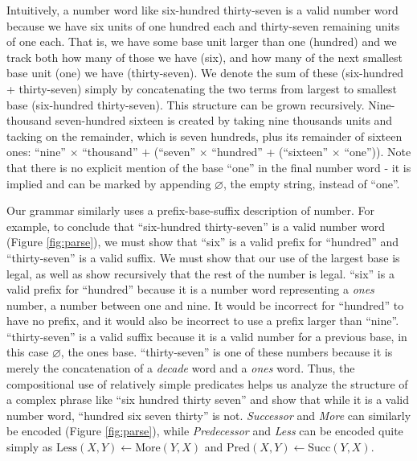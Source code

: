 \documentclass[10pt,letterpaper]{article}
\begin{document}
Intuitively, a number word like six-hundred thirty-seven is a valid
number word because we have six units of one hundred each and
thirty-seven remaining units of one each. That is, we have some base
unit larger than one (hundred) and we track both how many of those we
have (six), and how many of the next smallest base unit (one) we have
(thirty-seven). We denote the sum of these (six-hundred +
thirty-seven) simply by concatenating the two terms from largest to
smallest base (six-hundred thirty-seven). This structure can be grown
recursively. Nine-thousand seven-hundred sixteen is created by taking
nine thousands units and tacking on the remainder, which is seven
hundreds, plus its remainder of sixteen ones: ``nine'' $\times$
``thousand'' $+$ (``seven'' $\times$ ``hundred'' + (``sixteen''
$\times$ ``one'')). Note that there is no explicit mention of the base
``one'' in the final number word - it is implied and can be marked by
appending $\varnothing$, the empty string, instead of ``one''.

Our grammar similarly uses a prefix-base-suffix description of number.
For example, to conclude that ``six-hundred thirty-seven'' is a valid
number word (Figure \ref{fig:parse}), we must show that ``six'' is a
valid prefix for ``hundred'' and ``thirty-seven'' is a valid suffix.
We must show that our use of the largest base is legal, as well as
show recursively that the rest of the number is legal. ``six'' is a
valid prefix for ``hundred'' because it is a number word representing
a \emph{ones} number, a number between one and nine. It would be
incorrect for ``hundred'' to have no prefix, and it would also be
incorrect to use a prefix larger than ``nine''. ``thirty-seven'' is a
valid suffix because it is a valid number for a previous base, in this
case $\varnothing$, the ones base. ``thirty-seven'' is one of these
numbers because it is merely the concatenation of a \emph{decade} word
and a \emph{ones} word. Thus, the compositional use of relatively
simple predicates helps us analyze the structure of a complex phrase
like ``six hundred thirty seven'' and show that while it is a valid
number word, ``hundred six seven thirty'' is not. \emph{Successor} and
\emph{More} can similarly be encoded (Figure \ref{fig:parse}), while
\emph{Predecessor} and \emph{Less} can be encoded quite simply as
$\text{Less}(X,Y) \leftarrow \text{More}(Y,X)$ and $\text{Pred}(X,Y)
\leftarrow \text{Succ}(Y,X)$.
\end{document}
